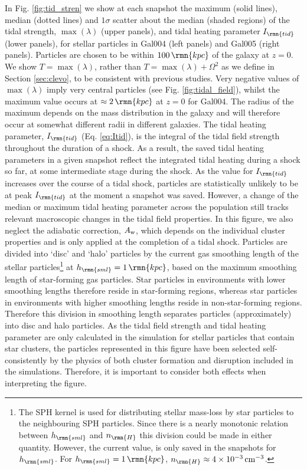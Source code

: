 \documentclass[fleqn,usenatbib]{mnras}
\newcommand\kpc{\,\rmn{kpc}}
\newcommand{\cmcubed}              {\,{\rm cm}^{-3}}
\begin{document}
In Fig. \ref{fig:tid_stren} we show at each snapshot the maximum (solid lines), median (dotted lines) and $1\sigma$ scatter about the median (shaded regions) of the tidal strength, $\max (\lambda)$ (upper panels), and tidal heating parameter $I_\rmn{tid}$ (lower panels), for stellar particles in Gal004 (left panels) and Gal005 (right panels). Particles are chosen to be within $100 \kpc$ of the galaxy at $z=0$.
We show $T = \max (\lambda)$, rather than $T = \max (\lambda) + \Omega^2$ as we define in Section \ref{sec:clevo}, to be consistent with previous studies.
Very negative values of $\max (\lambda)$ imply very central particles (see Fig. \ref{fig:tidal_field}), whilst the maximum value occurs at $\approx2 \kpc$ at $z=0$ for Gal004. The radius of the maximum depends on the mass distribution in the galaxy and will therefore occur at somewhat different radii in different galaxies.
The tidal heating parameter, $I_\rmn{tid}$ (Eq. \ref{eq:Itid}), is the integral of the tidal field strength throughout the duration of a shock. As a result, the saved tidal heating parameters in a given snapshot reflect the integrated tidal heating during a shock so far, at some intermediate stage during the shock. As the value for $I_\rmn{tid}$ increases over the course of a tidal shock, particles are statistically unlikely to be at peak $I_\rmn{tid}$ at the moment a snapshot was saved. However, a change of the median or maximum tidal heating parameter across the population still tracks relevant macroscopic changes in the tidal field properties. In this figure, we also neglect the adiabatic correction, $A_{\rm w}$, which depends on the individual cluster properties and is only applied at the completion of a tidal shock.
Particles are divided into `disc' and `halo' particles by the current gas smoothing length of the stellar particles\footnote{The SPH kernel is used for distributing stellar mass-loss by star particles to the neighbouring SPH particles. Since there is a nearly monotonic relation between $h_\rmn{sml}$ and $n_\rmn{H}$ this division could be made in either quantity. However, the current value, is only saved in the snapshots for $h_\rmn{sml}$. For $h_\rmn{sml} = 1 \kpc$, $n_\rmn{H} \approx 4 \times 10^{-3} \cmcubed$.} at $h_\rmn{sml} = 1 \kpc$, based on the maximum smoothing length of star-forming gas particles. Star particles in environments with lower smoothing lengths therefore reside in star-forming regions, whereas star particles in environments with higher smoothing lengths reside in non-star-forming regions. Therefore this division in smoothing length separates particles (approximately) into disc and halo particles.
As the tidal field strength and tidal heating parameter are only calculated in the simulation for stellar particles that contain star clusters, the particles represented in this figure have been selected self-consistently by the physics of both cluster formation and disruption included in the simulations. Therefore, it is important to consider both effects when interpreting the figure.
\end{document}
